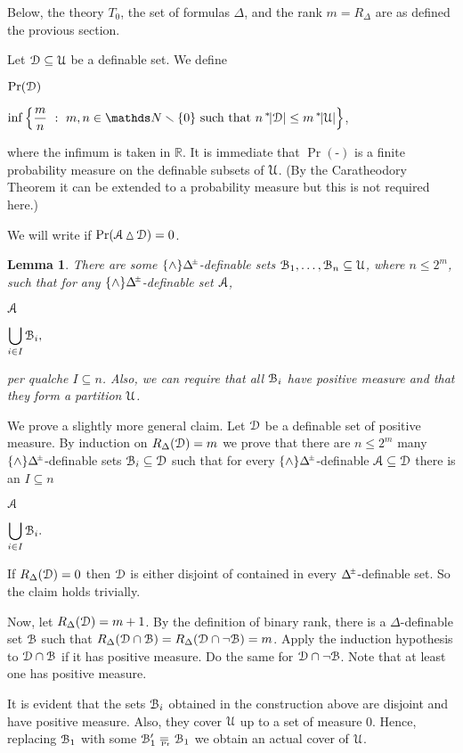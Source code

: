 \documentclass[10pt,oneside, openany]{book}
\renewcommand*{\emph}[1]{%
   \smash{\tikz[baseline]\node[rectangle, fill=green!40, rounded corners, inner xsep=0.5ex, inner ysep=0.2ex, anchor=base, minimum height = 2.7ex]{#1};}}
\def\NN{\mathds N}
\def\RR{\mathds R}
\def\pmDelta{\Delta\hskip-.3ex\raisebox{1ex}{\tiny$\pm$}}
\def\sm{\smallsetminus}
\def\simdiff{\mathop\vartriangle}
\def\D{\EuScript D}
\def\Aa{\EuScript A}
\def\U{\EuScript U}
\def\B{\EuScript B}
\newcounter{thm}[chapter]
\theoremstyle{mio}
\newtheorem{lemma}[thm]{Lemma}
\theoremstyle{liscio}
\def\QED{\noindent\nolinebreak[4]\hfill\rlap{\ \ $\Box$}\medskip}
\renewenvironment{proof}[1][Proof]%
{\smallskip\begin{trivlist}\item[\hskip\labelsep {\bf #1}]}
{\QED\end{trivlist}}
\def\ns{{}^*\kern-.3ex}
\def\eqPr{\mathrel{\raise-.6ex\rlap{\kern0.3ex\tiny Pr}\raise.1ex\hbox{$=$\,} }}
\begin{document}
\def\ceq#1#2#3{\parbox[t]{20ex}{$\displaystyle #1$}\medrel{#2}$\displaystyle  #3$}

Below, the theory $T_0$, the set of formulas $\Delta$, and the rank $m=R_\Delta$ are as defined the provious section.

Let $\D\subseteq\U$ be a definable set.
%
We define

\ceq{\hfill\Pr(\D)}
{=}
{\inf\Big\{\frac{m}{n}\ :\ m,n\in\NN\sm\{0\} \text{ such that } n\,\ns|\D|\le m\,\ns|\U|\Big\}},

where the infimum is taken in $\RR$.
%
It is immediate that $\Pr(\mbox{-})$ is a finite probability measure on the definable subsets of $\U$.
%
(By the Caratheodory Theorem it can be extended to a probability measure but this is not required here.)

We will write \emph{$\Aa\eqPr\D$} if $\Pr(\Aa\simdiff\D)=0$.

\begin{lemma}\label{lem_atoms}
  There are some $\{\wedge\}\pmDelta$-definable sets $\B_1,\dots,\B_n\subseteq\U$, where $n\le2^m$, such that for any $\{\wedge\}\pmDelta$-definable set $\Aa$, 
  
  \ceq{\hfill\Aa}{\eqPr}{\bigcup_{i\in I}\B_i,}

  per qualche $I\subseteq n$.
  Also, we can require that all $\B_i$ have positive measure and that they form a partition $\U$.
\end{lemma}

\begin{proof}
  We prove a slightly more general claim.
  Let $\D$ be a definable set of positive measure.
  By induction on $R_\Delta(\D)=m$ we prove that there are $n\le 2^m$ many $\{\wedge\}\pmDelta$-definable sets $\B_i\subseteq\D$ such that for every $\{\wedge\}\pmDelta$-definable $\Aa\subseteq\D$ there is an $I\subseteq n$

  \ceq{\hfill\Aa}{\eqPr}{\bigcup_{i\in I}\B_i.}

  If  $R_\Delta(\D)=0$ then $\D$ is either disjoint of contained in every $\pmDelta$-definable set.
  So the claim holds trivially.

  Now, let $R_\Delta(\D)=m+1$.
  By the definition of binary rank, there is a $\Delta$-definable set $\B$ such that $R_\Delta(\D\cap\B)=R_\Delta(\D\cap\neg\B)=m$.
  Apply the induction hypothesis to $\D\cap\B$ if it has positive measure. 
  Do the same for $\D\cap\neg\B$.
  Note that at least one has positive measure.

  It is evident that the sets $\B_i$ obtained in the construction above are disjoint and have positive measure.
  Also, they cover $\U$ up to a set of measure $0$.
  Hence, replacing $\B_1$ with some $\B'_1\eqPr\B_1$ we obtain an actual cover of $\U$.
\end{proof}
\end{document}
